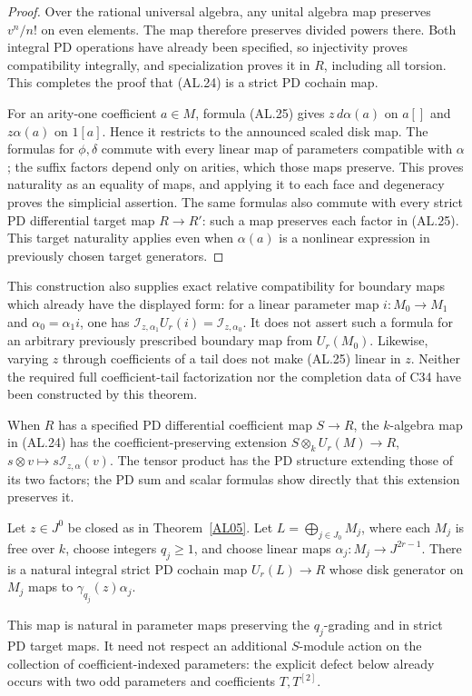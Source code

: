 \begin{proof}
Over the rational universal algebra, any unital algebra
map preserves $v^n/n!$ on even elements.  The map
therefore preserves divided powers there.
Both integral PD operations have already been specified,
so injectivity proves compatibility integrally, and
specialization proves it in $R$, including all torsion.
This completes the proof that \textup{(AL.24)} is a
strict PD cochain map.

For an arity-one coefficient $a\in M$, formula
\textup{(AL.25)} gives $z\,d\alpha(a)$ on $a[]$ and
$z\alpha(a)$ on $1[a]$.  Hence it restricts to the
announced scaled disk map.
The formulas for $\phi,\delta$ commute with every linear
map of parameters compatible with $\alpha$; the
suffix factors depend only on arities, which those
maps preserve.  This proves naturality as an equality
of maps, and applying it to each face and degeneracy
proves the simplicial assertion.  The same formulas
also commute with every strict PD differential target
map $R\to R'$: such a map preserves each factor in
\textup{(AL.25)}.  This target naturality applies even
when $\alpha(a)$ is a nonlinear expression in
previously chosen target generators.
\end{proof}

This construction also supplies exact relative compatibility
for boundary maps which already have the displayed form:
for a linear parameter map $i:M_0\to M_1$ and
$\alpha_0=\alpha_1i$, one has
$\mathcal I_{z,\alpha_1}U_r(i)=\mathcal I_{z,\alpha_0}$.
It does not assert such a formula for an arbitrary
previously prescribed boundary map from $U_r(M_0)$.
Likewise, varying $z$ through coefficients of a tail
does not make \textup{(AL.25)} linear in $z$.
Neither the required full coefficient-tail factorization
nor the completion data of C34 have been constructed
by this theorem.

When $R$ has a specified PD differential coefficient map
$S\to R$, the $k$-algebra map in \textup{(AL.24)} has the
coefficient-preserving extension
$S\otimes_kU_r(M)\to R$, $s\otimes v\mapsto s\mathcal I_{z,\alpha}(v)$.
The tensor product has the PD structure extending those
of its two factors; the PD sum and scalar formulas show
directly that this extension preserves it.

\begin{proposition}
\label{AL06}
Let $z\in J^0$ be closed as in Theorem~\ref{AL05}.
Let $L=\bigoplus_{j\in J_0}M_j$, where each $M_j$ is
free over $k$, choose integers $q_j\geq1$, and choose
linear maps $\alpha_j:M_j\to J^{2r-1}$.
There is a natural integral strict PD cochain map
$U_r(L)\to R$ whose disk generator on $M_j$ maps to
$\gamma_{q_j}(z)\alpha_j$.

This map is natural in parameter maps preserving the
$q_j$-grading and in strict PD target maps.
It need not respect an additional $S$-module action
on the collection of coefficient-indexed parameters:
the explicit defect below already occurs with two
odd parameters and coefficients $T,T^{[2]}$.
\end{proposition}

